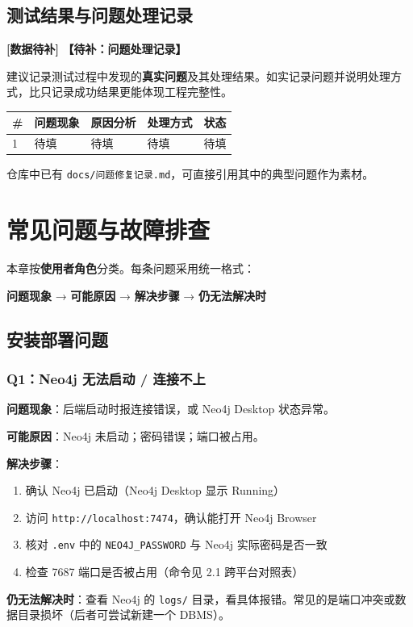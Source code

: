 \documentclass[UTF8,a4paper,11pt]{ctexrep}
\newcommand{\todomark}{\textcolor{todobar}{\textbf{[数据待补]}}}
\begin{document}
\section{测试结果与问题处理记录}

\begin{todobox}
\todomark{} \textbf{【待补：问题处理记录】}

建议记录测试过程中发现的\textbf{真实问题}及其处理结果。如实记录问题并说明处理方式，比只记录成功结果更能体现工程完整性。

\begin{center}
\footnotesize
\begin{tabularx}{\linewidth}{@{}XXXXX@{}}
\toprule
\# & 问题现象 & 原因分析 & 处理方式 & 状态 \\
\midrule
1 & 待填 & 待填 & 待填 & 待填 \\
\bottomrule
\end{tabularx}
\end{center}
仓库中已有 \texttt{docs/问题修复记录.md}，可直接引用其中的典型问题作为素材。

\end{todobox}


\chapter{常见问题与故障排查}

本章按\textbf{使用者角色}分类。每条问题采用统一格式：

\begin{notebox}
\textbf{问题现象} → \textbf{可能原因} → \textbf{解决步骤} → \textbf{仍无法解决时}

\end{notebox}


\section{安装部署问题}


\subsection{Q1：Neo4j 无法启动 / 连接不上}

\textbf{问题现象}：后端启动时报连接错误，或 Neo4j Desktop 状态异常。

\textbf{可能原因}：Neo4j 未启动；密码错误；端口被占用。

\textbf{解决步骤}：

\begin{enumerate}
\item 确认 Neo4j 已启动（Neo4j Desktop 显示 Running）
\item 访问 \texttt{http://localhost:7474}，确认能打开 Neo4j Browser
\item 核对 \texttt{.env} 中的 \texttt{NEO4J\_PASSWORD} 与 Neo4j 实际密码是否一致
\item 检查 7687 端口是否被占用（命令见 2.1 跨平台对照表）
\end{enumerate}
\textbf{仍无法解决时}：查看 Neo4j 的 \texttt{logs/} 目录，看具体报错。常见的是端口冲突或数据目录损坏（后者可尝试新建一个 DBMS）。
\end{document}
